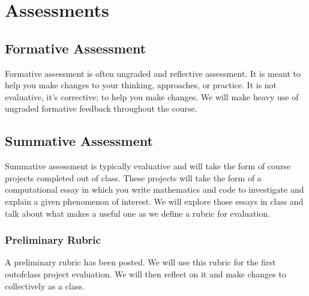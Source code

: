 \documentclass[letterpaper,10pt,english]{jupyterBook}
\begin{document}
\sphinxstepscope


\section{Assessments}
\label{\detokenize{content/0_course/assessments:assessments}}\label{\detokenize{content/0_course/assessments::doc}}

\subsection{Formative Assessment}
\label{\detokenize{content/0_course/assessments:formative-assessment}}
\sphinxAtStartPar
Formative assessment is often ungraded and reflective assessment. It is meant to help you make changes to your thinking, approaches, or practice. It is not evaluative, it’s corrective; to help you make changes. We will make heavy use of ungraded formative feedback throughout the course.


\subsection{Summative Assessment}
\label{\detokenize{content/0_course/assessments:summative-assessment}}
\sphinxAtStartPar
Summative assessment is typically evaluative and will take the form of course projects completed out of class. These projects will take the form of a computational essay in which you write mathematics and code to investigate and explain a given phenomenon of interest. We will explore those essays in class and talk about what makes a useful one as we define a rubric for evaluation.


\subsubsection{Preliminary Rubric}
\label{\detokenize{content/0_course/assessments:preliminary-rubric}}
\sphinxAtStartPar
A preliminary rubric has been posted. We will use this rubric for the first out\sphinxhyphen{}of\sphinxhyphen{}class project evaluation. We will then reflect on it and make changes to collectively as a class.
\end{document}
